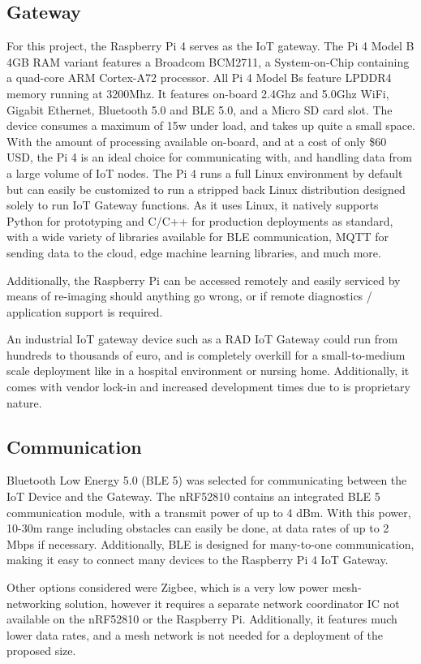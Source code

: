 \documentclass[conference]{IEEEtran}
\begin{document}
\subsection{Gateway}
For this project, the Raspberry Pi 4 serves as the IoT gateway. The Pi 4 Model B 4GB RAM variant features a Broadcom BCM2711, a System-on-Chip containing a quad-core ARM Cortex-A72 processor. All Pi 4 Model Bs feature LPDDR4 memory running at 3200Mhz. It features on-board 2.4Ghz and 5.0Ghz WiFi, Gigabit Ethernet, Bluetooth 5.0 and BLE 5.0, and a Micro SD card slot. The device consumes a maximum of 15w under load, and takes up quite a small space. With the amount of processing available on-board, and at a cost of only \$60 USD, the Pi 4 is an ideal choice for communicating with, and handling data from a large volume of IoT nodes. The Pi 4 runs a full Linux environment by default but can easily be customized to run a stripped back Linux distribution designed solely to run IoT Gateway functions. As it uses Linux, it natively supports Python for prototyping and C/C++ for production deployments as standard, with a wide variety of libraries available for BLE communication, MQTT for sending data to the cloud, edge machine learning libraries, and much more.

Additionally, the Raspberry Pi can be accessed remotely and easily serviced by means of re-imaging should anything go wrong, or if remote diagnostics / application support is required.

An industrial IoT gateway device such as a RAD IoT Gateway could run from hundreds to thousands of euro, and is completely overkill for a small-to-medium scale deployment like in a hospital environment or nursing home. Additionally, it comes with vendor lock-in and increased development times due to is proprietary nature.

\subsection{Communication}
Bluetooth Low Energy 5.0 (BLE 5) was selected for communicating between the IoT Device and the Gateway. The nRF52810 contains an integrated BLE 5 communication module, with a transmit power of up to 4 dBm. With this power, 10-30m range including obstacles can easily be done, at data rates of up to 2 Mbps if necessary. Additionally, BLE is designed for many-to-one communication, making it easy to connect many devices to the Raspberry Pi 4 IoT Gateway.

Other options considered were Zigbee, which is a very low power mesh-networking solution, however it requires a separate network coordinator IC not available on the nRF52810 or the Raspberry Pi. Additionally, it features much lower data rates, and a mesh network is not needed for a deployment of the proposed size.
\end{document}
